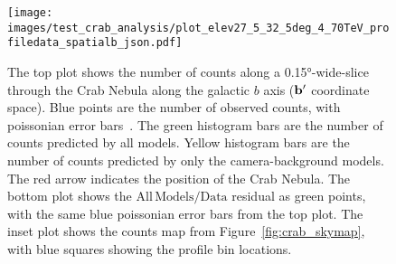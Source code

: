   \begin{figure}[!t]
    \centering
    \texttt{[image: images/test\_crab\_analysis/plot\_elev27\_5\_32\_5deg\_4\_70TeV\_profiledata\_spatialb\_json.pdf]}
    \caption[Crab Nebula Profile along Galactic $b$]
    {
      The top plot shows the number of counts along a \ang{0.15}-wide-slice through the Crab Nebula along the galactic $b$ axis ($\mathbf{b'}$ coordinate space).
      Blue points are the number of observed counts, with poissonian error bars~\cite{poissonfrequentistinterval}.
      The green histogram bars are the number of counts predicted by all models.
      Yellow histogram bars are the number of counts predicted by only the camera-background models.
      The red arrow indicates the position of the Crab Nebula.
      The bottom plot shows the $\mathrm{All\,Models}/\mathrm{Data}$ residual as green points, with the same blue poissonian error bars from the top plot.
      The inset plot shows the counts map from Figure~\ref{fig:crab_skymap}, with blue squares showing the profile bin locations.
    }
    \label{fig:crab_profile_b}
  \end{figure}
    
